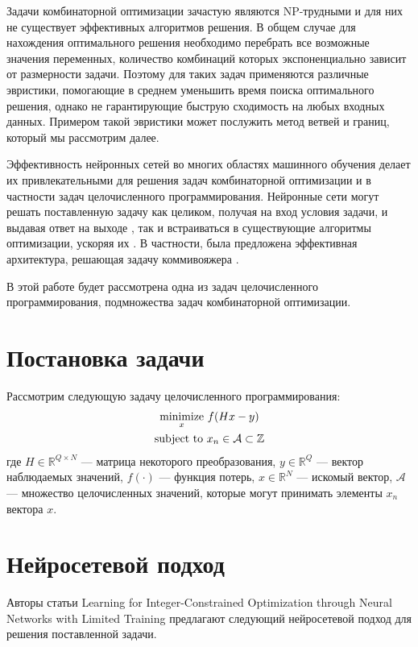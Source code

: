 \documentclass[12pt]{article}
\begin{document}
Задачи комбинаторной оптимизации зачастую являются NP-трудными и для них не существует эффективных алгоритмов решения. В общем случае для нахождения оптимального решения необходимо перебрать все возможные значения переменных, количество комбинаций которых экспоненциально зависит от размерности задачи. Поэтому для таких задач применяются различные эвристики, помогающие в среднем уменьшить время поиска оптимального решения, однако не гарантирующие быструю сходимость на любых входных данных. Примером такой эвристики может послужить метод ветвей и границ, который мы рассмотрим далее.

Эффективность нейронных сетей во многих областях машинного обучения делает их привлекательными для решения задач комбинаторной оптимизации и в частности задач целочисленного программирования. Нейронные сети могут решать поставленную задачу как целиком, получая на вход условия задачи, и выдавая ответ на выходе \cite{https://doi.org/10.48550/arxiv.1506.03134, https://doi.org/10.48550/arxiv.2011.05399}, так и встраиваться в существующие алгоритмы оптимизации, ускоряя их \cite{https://doi.org/10.48550/arxiv.2012.13349, https://doi.org/10.48550/arxiv.1811.06128}. В частности, была предложена эффективная архитектура, решающая задачу коммивояжера \cite{https://doi.org/10.48550/arxiv.1506.03134}.

В этой работе будет рассмотрена одна из задач целочисленного программирования, подмножества задач комбинаторной оптимизации.

\section{Постановка задачи}

Рассмотрим следующую задачу целочисленного программирования:
$$
\begin{gathered}
    {\operatornamewithlimits{minimize}_x} \ f(Hx - y) \\
    \text{subject to} \ x_n \in \mathcal{A} \subset \mathbb{Z}
\end{gathered}
$$
где $H \in \mathbb{R}^{Q \times N}$ — матрица некоторого преобразования, $y \in \mathbb{R}^Q$ — вектор наблюдаемых значений, $f(\cdot)$ — функция потерь, $x \in \mathbb{R}^N$ — искомый вектор, $\mathcal{A}$ — множество целочисленных значений, которые могут принимать элементы $x_n$ вектора $x$.




\section{Нейросетевой подход}
Авторы статьи Learning for Integer-Constrained Optimization through Neural Networks with Limited Training \cite{https://doi.org/10.48550/arxiv.2011.05399} предлагают следующий нейросетевой подход для решения поставленной задачи.
\end{document}
